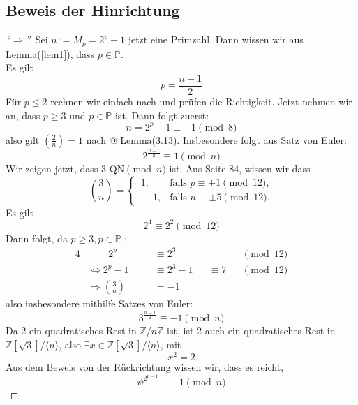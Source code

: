 \documentclass{article}
\makeatletter
\newcommand{\Prime}{\ensuremath{\mathbb{P}}}
\newcommand{\Integer}{\ensuremath{\mathbb{Z}}}
\newcommand{\Zmodn}{\ensuremath{\Integer/n\Integer}}
\newcommand{\ZadThreeModn}{\ensuremath{\Integer[\sqrt{3}]/\langle n \rangle}}
\newcommand{\Rmnum}[1]{\expandafter\@slowromancap\romannumeral #1@}
\makeatother
\begin{document}
\subsection{Beweis der Hinrichtung}
\begin{proof}[``$\Rightarrow$'']
Sei $n := M_p = 2^{p} - 1$ jetzt eine Primzahl. Dann wissen wir aus Lemma(\ref{lem1}), dass $p \in \Prime.$ \\Es gilt
\begin{equation}\label{nPequ}
 p = \frac{n + 1}{2}
\end{equation}
F\"{u}r $p \leq 2$ rechnen wir einfach nach und pr\"{u}fen die Richtigkeit. Jetzt nehmen wir an, dass $p \geq 3 $ und $ p \in \Prime$ ist. Dann folgt zuerst:
\[
	n = 2^p - 1 \equiv{-1} \pmod{8}
\]
also gilt $(\frac{2}{n}) = 1$ nach \cite{script} \Rmnum{2} Lemma(3.13). Insbesondere
folgt aus Satz von Euler:
\begin{equation}\label{twoPo}
	2^{\frac{n-1}{2}} \equiv{1} \pmod{n}
\end{equation}
Wir zeigen jetzt, dass 3 $\mbox{QN}\pmod{n}$ ist.
Aus \cite{script} Seite 84, wissen wir dass
\[
	\left(\frac{3}{n} \right) = 
	\begin{cases}
	\,1, &\text{falls $p \equiv{\pm1} \pmod{12}$,}\\
	\,-1, &\text{falls $n \equiv{\pm5} \pmod{12}$.}
	\end{cases}
\]
Es gilt
\[
	2^4 \equiv{2^2} \pmod{12}
\]
Dann folgt, da $p \geq 3, p \in \Prime$ :
\begin{alignat*}{4}
	&\phantom{\Rightarrow a} 2^{p}     		&&\equiv{2^3}      &&		   &&\pmod{12}\\
	&\Leftrightarrow 2^{p} - 1 	\quad 		&&\equiv{2^3 - 1}  &&\equiv{7} &&\pmod{12}\\
	&\Rightarrow \left( \frac{3}{n} \right) &&= -1			   &&			   &
\end{alignat*}
also insbesondere mithilfe Satzes von Euler:
\begin{equation}\label{threePot}
	3^{\frac{n-1}{2}} \equiv{-1} \pmod{n}
\end{equation}
Da 2 ein quadratisches Rest in $\Zmodn$ ist, ist 2 auch ein quadratisches Rest in
$\ZadThreeModn$, also $\exists x \in \ZadThreeModn$, mit 
\begin{equation}\label{xQuTwo}
	x^2 = 2
\end{equation}
Aus dem Beweis von der R\"{u}ckrichtung wissen wir, dass es reicht,
\begin{equation}\label{*}
	\psi^{2^{p-1}} \equiv{-1} \pmod{n} \tag{*}
\end{equation}

\end{proof}
\end{document}
